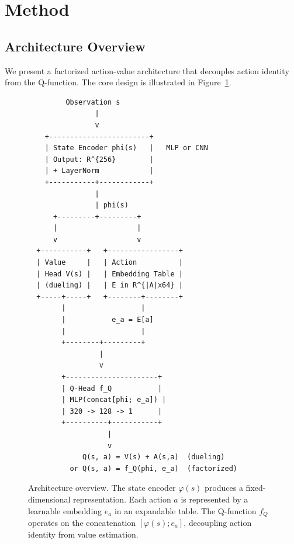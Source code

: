 \documentclass{article}
\begin{document}
\section{Method}
\label{sec:method}

\subsection{Architecture Overview}

We present a factorized action-value architecture that decouples action identity
from the Q-function. The core design is illustrated in Figure~\ref{fig:arch}.

\begin{figure}[h]
  \centering
  \begin{minipage}{0.85\linewidth}
  {\small
  \begin{verbatim}
         Observation s
                |
                v
    +------------------------+
    | State Encoder phi(s)   |   MLP or CNN
    | Output: R^{256}        |
    | + LayerNorm            |
    +-----------+------------+
                |
                | phi(s)
      +---------+---------+
      |                   |
      v                   v
  +-----------+   +-----------------+
  | Value     |   | Action          |
  | Head V(s) |   | Embedding Table |
  | (dueling) |   | E in R^{|A|x64} |
  +-----+-----+   +--------+--------+
        |                  |
        |           e_a = E[a]
        |                  |
        +--------+---------+
                 |
                 v
        +----------------------+
        | Q-Head f_Q           |
        | MLP(concat[phi; e_a]) |
        | 320 -> 128 -> 1      |
        +----------+-----------+
                   |
                   v
             Q(s, a) = V(s) + A(s,a)  (dueling)
          or Q(s, a) = f_Q(phi, e_a)  (factorized)
  \end{verbatim}
  }
  \end{minipage}
  \caption{Architecture overview. The state encoder $\varphi(s)$ produces a
  fixed-dimensional representation. Each action $a$ is represented by a
  learnable embedding $e_a$ in an expandable table. The Q-function $f_Q$
  operates on the concatenation $[\varphi(s); e_a]$, decoupling action identity
  from value estimation.}
  \label{fig:arch}
\end{figure}
\end{document}
